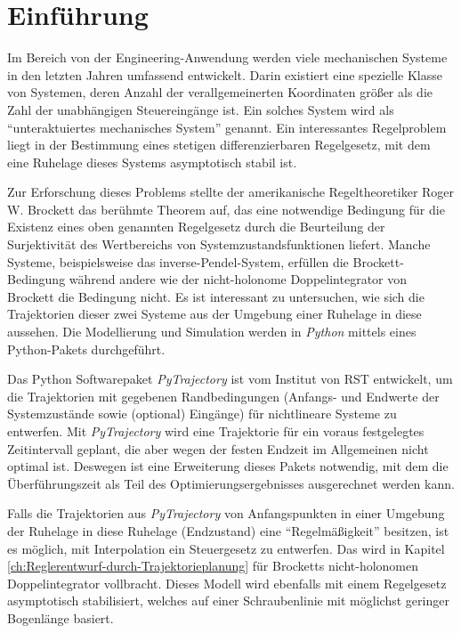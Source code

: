 \chapter{Einführung}
\label{Einführung}
Im Bereich von der Engineering-Anwendung werden viele mechanischen Systeme in den letzten Jahren umfassend entwickelt. Darin existiert eine spezielle Klasse von Systemen, deren Anzahl der verallgemeinerten Koordinaten größer als die Zahl der unabhängigen Steuereingänge ist. Ein solches System wird als ``unteraktuiertes mechanisches System'' genannt. Ein interessantes Regelproblem liegt in der Bestimmung eines stetigen differenzierbaren Regelgesetz, mit dem eine Ruhelage dieses Systems asymptotisch stabil ist. 


Zur Erforschung dieses Problems stellte der amerikanische Regeltheoretiker Roger W. Brockett das berühmte Theorem \cite{brockett1983asymptotic} auf, das eine notwendige Bedingung für die Existenz eines oben genannten Regelgesetz durch die Beurteilung der Surjektivität des Wertbereichs von Systemzustandsfunktionen liefert. Manche Systeme, beispielsweise das inverse-Pendel-System, erfüllen die Brockett-Bedingung während andere wie der nicht-holonome Doppelintegrator von Brockett die Bedingung nicht. Es ist interessant zu untersuchen, wie sich die Trajektorien dieser zwei Systeme aus der Umgebung einer Ruhelage in diese aussehen. Die Modellierung und Simulation werden in \emph{Python} mittels eines Python-Pakets durchgeführt.

Das Python Softwarepaket \emph{PyTrajectory} ist vom Institut von RST entwickelt, um die Trajektorien mit gegebenen Randbedingungen (Anfangs- und Endwerte der Systemzustände sowie (optional) Eingänge) für nichtlineare Systeme zu entwerfen. Mit \emph{PyTrajectory} wird eine Trajektorie für ein voraus festgelegtes Zeitintervall geplant, die aber wegen der festen Endzeit im Allgemeinen nicht optimal ist. Deswegen ist eine Erweiterung dieses Pakets notwendig, mit dem die Überführungszeit als Teil des Optimierungsergebnisses ausgerechnet werden kann.

Falls die Trajektorien aus \emph{PyTrajectory} von Anfangspunkten in einer Umgebung der Ruhelage in diese Ruhelage (Endzustand) eine ``Regelmäßigkeit'' besitzen, ist es möglich, mit Interpolation ein Steuergesetz zu entwerfen. Das wird in Kapitel \ref{ch:Reglerentwurf-durch-Trajektorieplanung} für Brocketts nicht-holonomen Doppelintegrator vollbracht. Dieses Modell wird ebenfalls mit einem Regelgesetz asymptotisch stabilisiert, welches auf einer Schraubenlinie mit möglichst geringer Bogenlänge basiert. 

